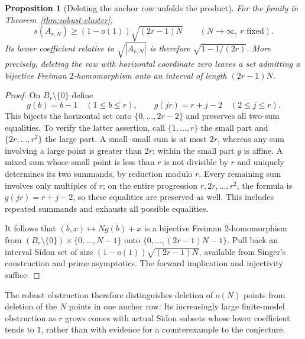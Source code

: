 \documentclass[11pt]{article}
\newtheorem{proposition}[theorem]{Proposition}
\theoremstyle{definition}
\theoremstyle{remark}
\begin{document}
\begin{proposition}[Deleting the anchor row unfolds the product]
\label{prop:cluster-unfolding}
For the family in Theorem~\ref{thm:robust-cluster},
\[
s(A_{r,N})\ge(1-o(1))\sqrt{(2r-1)N}\qquad(N\to\infty,\ r\text{ fixed}).
\]
Its lower coefficient relative to $\sqrt{|A_{r,N}|}$ is therefore
$\sqrt{1-1/(2r)}$. More precisely, deleting the row with horizontal
coordinate zero leaves a set admitting a bijective Freiman
$2$-homomorphism onto an interval of length $(2r-1)N$.
\end{proposition}
\begin{proof}
On $B_r\setminus\{0\}$ define
\[
g(b)=b-1\quad(1\le b\le r),\qquad
g(jr)=r+j-2\quad(2\le j\le r).
\]
This bijects the horizontal set onto $\{0,\ldots,2r-2\}$ and preserves
all two-sum equalities. To verify the latter assertion, call
$\{1,\ldots,r\}$ the small part and $\{2r,\ldots,r^2\}$ the large part.
A small--small sum is at most $2r$, whereas any sum involving a large
point is greater than $2r$; within the small part $g$ is affine.
A mixed sum whose small point is less than $r$ is not divisible by $r$
and uniquely determines its two summands, by reduction modulo $r$.
Every remaining sum involves only multiples of $r$; on the entire
progression $r,2r,\ldots,r^2$, the formula is $g(jr)=r+j-2$,
so these equalities are preserved as well. This includes repeated
summands and exhausts all possible equalities.

It follows that $(b,x)\mapsto Ng(b)+x$ is a bijective Freiman
$2$-homomorphism from
$(B_r\setminus\{0\})\times\{0,\ldots,N-1\}$ onto
$\{0,\ldots,(2r-1)N-1\}$. Pull back an interval Sidon set of size
$(1-o(1))\sqrt{(2r-1)N}$, available from Singer's construction and
prime asymptotics. The forward implication and injectivity suffice.
\end{proof}

The robust obstruction therefore distinguishes deletion of $o(N)$ points
from deletion of the $N$ points in one anchor row. Its increasingly large
finite-model obstruction as $r$ grows comes with actual Sidon subsets
whose lower coefficient tends to $1$, rather than with evidence for a
counterexample to the conjecture.
\end{document}
